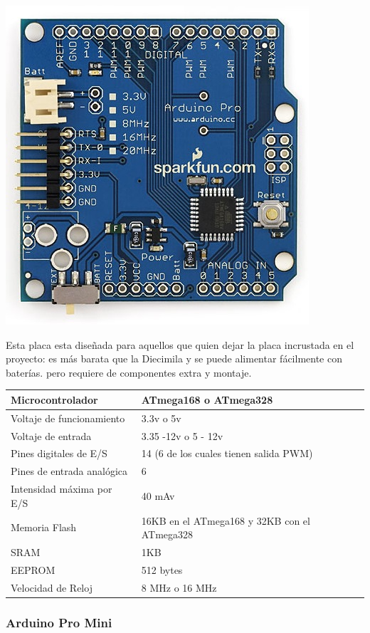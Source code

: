 \documentclass[12pt,a4papert,woside,openright,titlepage,final]{book}
\begin{document}
\includegraphics[scale=0.6]{ArduinoPro.jpg}

Esta placa esta diseñada para aquellos que quien dejar la placa incrustada en el
proyecto: es más barata que la Diecimila y se puede alimentar fácilmente con
baterías. pero requiere de componentes extra y montaje. 

\begin{tabular}{||l | l ||}
\hline
\hline
Microcontrolador & ATmega168 o ATmega328\\
\hline
Voltaje de funcionamiento & 3.3v o 5v\\
\hline
Voltaje de entrada & 3.35 -12v o 5 - 12v\\
\hline
Pines digitales de E/S & 14 (6 de los cuales tienen salida PWM)\\
\hline
Pines de entrada analógica & 6\\
\hline
Intensidad máxima por E/S & 40 mAv\\
\hline
Memoria Flash & 16KB en el ATmega168 y 32KB con el ATmega328 \\
\hline
SRAM & 1KB\\
\hline
EEPROM & 512 bytes\\
\hline
Velocidad de Reloj & 8 MHz o 16 MHz\\
\hline
\hline
\end{tabular}

\subsubsection{Arduino Pro Mini}
\end{document}
